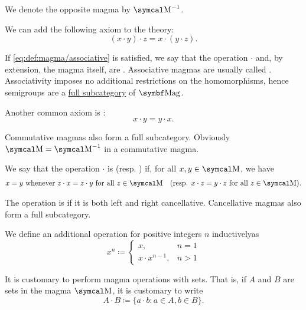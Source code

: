 \begin{definition}
\begin{DefEnum}
    We denote the opposite magma by \( \CM^{-1} \).

     We can add the following axiom to the theory:
    \begin{equation}\label{eq:def:magma/associative}
      (x \cdot y) \cdot z = x \cdot (y \cdot z).
    \end{equation}

    If \eqref{eq:def:magma/associative} is satisfied, we say that the operation \( \cdot \) and, by extension, the magma itself, are . Associative magmas are usually called . Associativity imposes no additional restrictions on the homomorphisms, hence semigroups are a \hyperref[def:subcategory]{full subcategory} of \( \Cat{Mag} \).

     Another common axiom is :
    \begin{equation}\label{eq:def:magma/commutative}
      x \cdot y = y \cdot x.
    \end{equation}

    Commutative magmas also form a full subcategory. Obviously \( \CM = \CM^{-1} \) in a commutative magma.

     We say that the operation \( \cdot \) is  (resp. ) if, for all \( x, y \in \CM \), we have
    \begin{align}\label{eq:def:magma/cancellative}
      x = y \Twhenever z \cdot x = z \cdot y \Tforall z \in \CM
      &&
      (\text{resp. } x \cdot z = y \cdot z \Tforall z \in \CM).
    \end{align}

    The operation is  if it is both left and right cancellative. Cancellative magmas also form a full subcategory.

     We define an additional  operation for positive integers \( n \) inductively\IND as
    \begin{equation}\label{eq:def:magma/exponentiation}
      x^n \coloneqq \begin{cases}
        x,               & n = 1 \\
        x \cdot x^{n-1}, & n > 1
      \end{cases}
    \end{equation}

     It is customary to perform magma operations with sets. That is, if \( A \) and \( B \) are sets in the magma \( \CM \), it is customary to write
    \begin{equation*}
      A \cdot B \coloneqq \{ a \cdot b \colon a \in A, b \in B \}.
    \end{equation*}


\end{DefEnum}
\end{definition}
